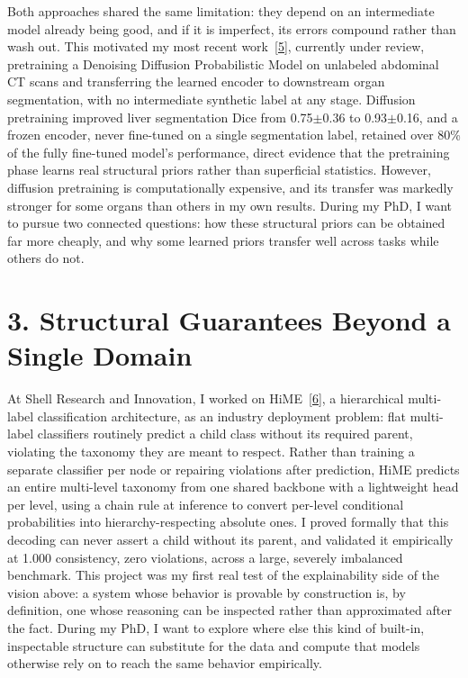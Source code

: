 \documentclass[11pt]{article}
\begin{document}
Both approaches shared the same limitation: they depend on an intermediate model already being good, and if it is imperfect, its errors compound rather than wash out. This motivated my most recent work~\hyperref[ref5]{[5]}, currently under review, pretraining a Denoising Diffusion Probabilistic Model on unlabeled abdominal CT scans and transferring the learned encoder to downstream organ segmentation, with no intermediate synthetic label at any stage. Diffusion pretraining improved liver segmentation Dice from 0.75$\pm$0.36 to 0.93$\pm$0.16, and a frozen encoder, never fine-tuned on a single segmentation label, retained over 80\% of the fully fine-tuned model's performance, direct evidence that the pretraining phase learns real structural priors rather than superficial statistics. However, diffusion pretraining is computationally expensive, and its transfer was markedly stronger for some organs than others in my own results. During my PhD, I want to pursue two connected questions: how these structural priors can be obtained far more cheaply, and why some learned priors transfer well across tasks while others do not.

\section*{3. Structural Guarantees Beyond a Single Domain}

At Shell Research and Innovation, I worked on HiME~\hyperref[ref6]{[6]}, a hierarchical multi-label classification architecture, as an industry deployment problem: flat multi-label classifiers routinely predict a child class without its required parent, violating the taxonomy they are meant to respect. Rather than training a separate classifier per node or repairing violations after prediction, HiME predicts an entire multi-level taxonomy from one shared backbone with a lightweight head per level, using a chain rule at inference to convert per-level conditional probabilities into hierarchy-respecting absolute ones. I proved formally that this decoding can never assert a child without its parent, and validated it empirically at 1.000 consistency, zero violations, across a large, severely imbalanced benchmark. This project was my first real test of the explainability side of the vision above: a system whose behavior is provable by construction is, by definition, one whose reasoning can be inspected rather than approximated after the fact. During my PhD, I want to explore where else this kind of built-in, inspectable structure can substitute for the data and compute that models otherwise rely on to reach the same behavior empirically.
\end{document}
